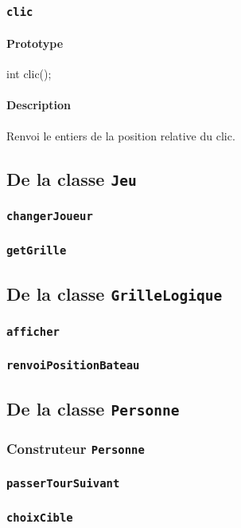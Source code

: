 \documentclass[12pt,a4paper]{article}
\begin{document}
			\subsubsection{\texttt{clic}}
				\paragraph{Prototype}
					int clic();
				\paragraph{Description}
					Renvoi le entiers de la position relative du clic.
		\subsection{De la classe \texttt{Jeu}}
			\subsubsection{\texttt{changerJoueur}}
			\subsubsection{\texttt{getGrille}}
		\subsection{De la classe \texttt{GrilleLogique}}
			\subsubsection{\texttt{afficher}}
			\subsubsection{\texttt{renvoiPositionBateau}}
		\subsection{De la classe \texttt{Personne}}
			\subsubsection{Construteur \texttt{Personne}}
			\subsubsection{\texttt{passerTourSuivant}}
			\subsubsection{\texttt{choixCible}}
\end{document}
